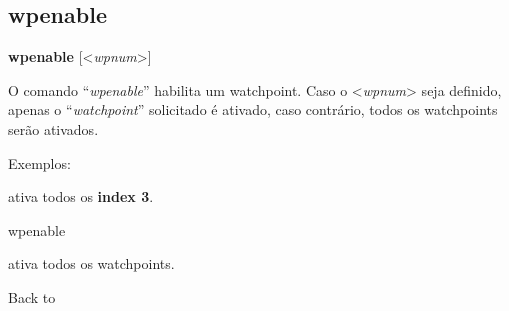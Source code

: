 \documentclass[letterpaper,10pt,brazil]{sphinxmanual}
\begin{document}
\subsection{wpenable}
\label{debugger/watchpoint:wpenable}\label{debugger/watchpoint:debugger-command-wpenable}
\begin{DUlineblock}{0em}
\item[]
\begin{DUlineblock}{\DUlineblockindent}
\item[] \textbf{wpenable} {[}\textless{}\emph{wpnum}\textgreater{}{]}
\item[] 
\end{DUlineblock}
\item[] O comando ``\emph{wpenable}'' habilita um watchpoint. Caso o \textless{}\emph{wpnum}\textgreater{} seja definido, apenas o ``\emph{watchpoint}'' solicitado é ativado, caso contrário, todos os watchpoints serão ativados.
\item[] 
\item[] Exemplos:
\item[] 
\item[]
\begin{DUlineblock}{\DUlineblockindent}
\item[] 
\item[] 
\end{DUlineblock}
\item[] ativa todos os \textbf{index 3}.
\item[] 
\item[]
\begin{DUlineblock}{\DUlineblockindent}
\item[] wpenable
\item[] 
\end{DUlineblock}
\item[] ativa todos os watchpoints.
\item[] 
\item[] Back to {\hyperref[debugger/watchpoint:debugger\string-watchpoints\string-list]{}}
\end{DUlineblock}
\begin{quote}
\label{debugger/watchpoint:debugger-command-wplist}\end{quote}
\end{document}
